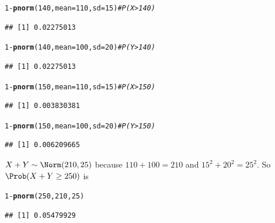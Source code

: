 \documentclass[twoside]{book}\usepackage[]{graphicx}\usepackage[]{xcolor}
\makeatletter
\newcommand{\hlnum}[1]{\textcolor[rgb]{0.686,0.059,0.569}{#1}}%
\newcommand{\hlcom}[1]{\textcolor[rgb]{0.678,0.584,0.686}{\textit{#1}}}%
\newcommand{\hlopt}[1]{\textcolor[rgb]{0,0,0}{#1}}%
\newcommand{\hlstd}[1]{\textcolor[rgb]{0.345,0.345,0.345}{#1}}%
\newcommand{\hlkwc}[1]{\textcolor[rgb]{0.333,0.667,0.333}{#1}}%
\newcommand{\hlkwd}[1]{\textcolor[rgb]{0.737,0.353,0.396}{\textbf{#1}}}%
\newenvironment{kframe}{%
 \def\at@end@of@kframe{}%
 \ifinner\ifhmode%
  \def\at@end@of@kframe{\end{minipage}}%
  \begin{minipage}{\columnwidth}%
 \fi\fi%
 \def\FrameCommand##1{\hskip\@totalleftmargin \hskip-\fboxsep
 \colorbox{shadecolor}{##1}\hskip-\fboxsep
     \hskip-\linewidth \hskip-\@totalleftmargin \hskip\columnwidth}%
 \MakeFramed {\advance\hsize-\width
   \@totalleftmargin\z@ \linewidth\hsize
   \@setminipage}}%
 {\par\unskip\endMakeFramed%
 \at@end@of@kframe}
\newenvironment{knitrout}{}{} %
\makeatother
\begin{document}
\begin{solution}
\begin{knitrout}
\color{fgcolor}\begin{kframe}
\begin{alltt}
\hlnum{1} \hlopt{-} \hlkwd{pnorm}\hlstd{(}\hlnum{140}\hlstd{,} \hlkwc{mean} \hlstd{=} \hlnum{110}\hlstd{,} \hlkwc{sd} \hlstd{=} \hlnum{15}\hlstd{)}  \hlcom{#  P(X > 140)}
\end{alltt}
\begin{verbatim}
## [1] 0.02275013
\end{verbatim}
\begin{alltt}
\hlnum{1} \hlopt{-} \hlkwd{pnorm}\hlstd{(}\hlnum{140}\hlstd{,} \hlkwc{mean} \hlstd{=} \hlnum{100}\hlstd{,} \hlkwc{sd} \hlstd{=} \hlnum{20}\hlstd{)}  \hlcom{#  P(Y > 140)}
\end{alltt}
\begin{verbatim}
## [1] 0.02275013
\end{verbatim}
\begin{alltt}
\hlnum{1} \hlopt{-} \hlkwd{pnorm}\hlstd{(}\hlnum{150}\hlstd{,} \hlkwc{mean} \hlstd{=} \hlnum{110}\hlstd{,} \hlkwc{sd} \hlstd{=} \hlnum{15}\hlstd{)}  \hlcom{#  P(X > 150)}
\end{alltt}
\begin{verbatim}
## [1] 0.003830381
\end{verbatim}
\begin{alltt}
\hlnum{1} \hlopt{-} \hlkwd{pnorm}\hlstd{(}\hlnum{150}\hlstd{,} \hlkwc{mean} \hlstd{=} \hlnum{100}\hlstd{,} \hlkwc{sd} \hlstd{=} \hlnum{20}\hlstd{)}  \hlcom{#  P(Y > 150)}
\end{alltt}
\begin{verbatim}
## [1] 0.006209665
\end{verbatim}
\end{kframe}
\end{knitrout}
$X + Y \sim \Norm( 210, 25 )$ because $110 + 100 = 210$ and $15^2 + 20^2 = 25^2$.  
So $\Prob(X + Y \ge 250)$ is
\begin{knitrout}
\color{fgcolor}\begin{kframe}
\begin{alltt}
\hlnum{1} \hlopt{-} \hlkwd{pnorm}\hlstd{(}\hlnum{250}\hlstd{,} \hlnum{210}\hlstd{,} \hlnum{25}\hlstd{)}
\end{alltt}
\begin{verbatim}
## [1] 0.05479929
\end{verbatim}

\end{kframe}
\end{knitrout}
\end{solution}
\end{document}
